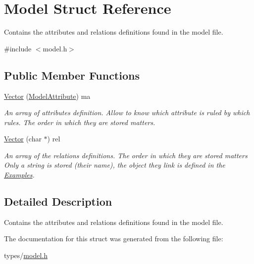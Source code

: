 \hypertarget{struct_model}{}\section{Model Struct Reference}
\label{struct_model}


Contains the attributes and relations definitions found in the model file.  




{\ttfamily \#include $<$model.\+h$>$}

\subsection*{Public Member Functions}
\begin{DoxyCompactItemize}
\item 
\hyperlink{struct_model_ae1a8ebaaec37cc02f9419738f654bb8d}{Vector} (\hyperlink{struct_model_attribute}{Model\+Attribute}) ma\hypertarget{struct_model_ae1a8ebaaec37cc02f9419738f654bb8d}{}\label{struct_model_ae1a8ebaaec37cc02f9419738f654bb8d}

\begin{DoxyCompactList}\small\item\em An array of attributes definition. Allow to know which attribute is ruled by which rules. The order in which they are stored matters. \end{DoxyCompactList}\item 
\hyperlink{struct_model_ae121a245ce71ea39c11bd4500ca1105a}{Vector} (char $\ast$) rel\hypertarget{struct_model_ae121a245ce71ea39c11bd4500ca1105a}{}\label{struct_model_ae121a245ce71ea39c11bd4500ca1105a}

\begin{DoxyCompactList}\small\item\em An array of the relations definitions. The order in which they are stored matters Only a string is stored (their name), the object they link is defined in the \hyperlink{struct_examples}{Examples}. \end{DoxyCompactList}\end{DoxyCompactItemize}


\subsection{Detailed Description}
Contains the attributes and relations definitions found in the model file. 

The documentation for this struct was generated from the following file\+:\begin{DoxyCompactItemize}
\item 
types/\hyperlink{model_8h}{model.\+h}\end{DoxyCompactItemize}
